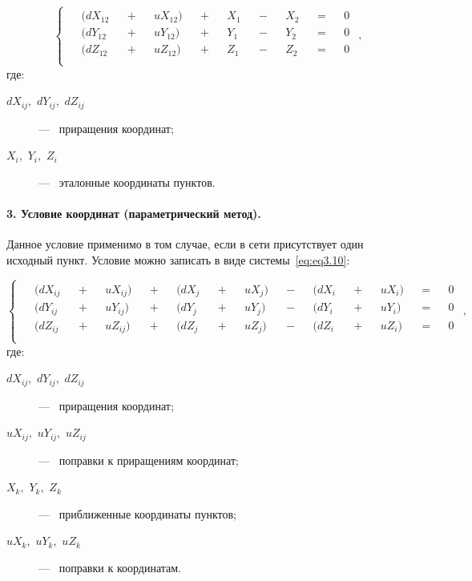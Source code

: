 \begin{equation}\label{eq:eq3.9}
	\!
	\begin{cases}
		\begin{aligned}
			&(dX_{12} &&+ &&uX_{12}) &&+ &&X_{1} &&- &&X_{2}  &&= &&0 \\
			&(dY_{12} &&+ &&uY_{12}) &&+ &&Y_{1} &&- &&Y_{2}  &&= &&0 \\
			&(dZ_{12} &&+ &&uZ_{12}) &&+ &&Z_{1} &&- &&Z_{2}  &&= &&0 \\
		\end{aligned}
	\end{cases},
\end{equation}
где: 
\begin{description}
	\item[$dX_{ij},$ $dY_{ij},$ $dZ_{ij}$] ---~ приращения координат; 
	\item[$X_{i},$ $Y_{i},$ $Z_{i}$] ---~ эталонные координаты пунктов.
\end{description}



\paragraph{3. Условие координат (параметрический метод).}\label{Условие_Координат}


Данное условие применимо в том случае, если в сети присутствует один исходный пункт. 
Условие можно записать в виде системы~\cref{eq:eq3.10}:


\begin{equation}\label{eq:eq3.10}
	\!
	\begin{cases}
		\begin{aligned}
			&(dX_{ij} &&+ &&uX_{ij}) &&+ &&(dX_{j} &&+ &&uX_{j}) &&- &&(dX_{i} &&+ &&uX_{i}) &&= &&0 \\
			&(dY_{ij} &&+ &&uY_{ij}) &&+ &&(dY_{j} &&+ &&uY_{j}) &&- &&(dY_{i} &&+ &&uY_{i}) &&= &&0 \\
			&(dZ_{ij} &&+ &&uZ_{ij}) &&+ &&(dZ_{j} &&+ &&uZ_{j}) &&- &&(dZ_{i} &&+ &&uZ_{i}) &&= &&0 \\
		\end{aligned}
	\end{cases},
\end{equation}
где: 
\begin{description}
	\item[$dX_{ij},$ $dY_{ij},$ $dZ_{ij}$] ---~ приращения координат; 
	\item[$uX_{ij},$ $uY_{ij},$ $uZ_{ij}$] ---~ поправки к приращениям координат;
	\item[$X_{k},$ $Y_{k},$ $Z_{k}$] ---~ приближенные координаты пунктов;
	\item[$uX_{k},$ $uY_{k},$ $uZ_{k}$] ---~ поправки к координатам.
\end{description}



